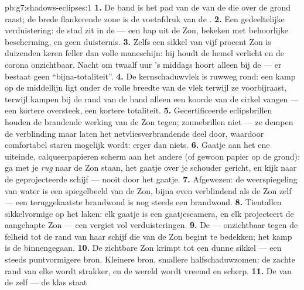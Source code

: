 \begin{solution}{pb:g7:shadows-eclipses:1}
\textbf{1.} De band is het pad van de  van de 
die over de grond raast; de brede flankerende zone is de voetafdruk
van de .
\textbf{2.} Een gedeeltelijke verduistering: de stad zit in de
 --- een hap uit de Zon, bekeken met behoorlijke
bescherming, en geen duisternis.
\textbf{3.} Zelfs een sikkel van vijf procent Zon is duizenden keren
feller dan volle maneschijn: hij houdt de hemel verlicht en de corona
onzichtbaar. Nacht om twaalf uur 's middags hoort alleen bij de
 --- er bestaat geen ``bijna-totaliteit''.
\textbf{4.} De kernschaduwvlek is ruwweg rond: een kamp op de
middellijn ligt onder de volle breedte van de vlek terwijl ze
voorbijraast, terwijl kampen bij de rand van de band alleen een koorde
van de cirkel vangen --- een kortere oversteek, een kortere
totaliteit.
\textbf{5.} Gecertificeerde eclipsbrillen houden de brandende werking
van de Zon tegen; zonnebrillen niet --- ze dempen de verblinding maar
laten het netvliesverbrandende deel door, waardoor comfortabel staren
mogelijk wordt: erger dan niets.
\textbf{6.} Gaatje aan het ene uiteinde, calqueerpapieren scherm aan
het andere (of gewoon papier op de grond): ga met je \emph{rug} naar
de Zon staan, het gaatje over je schouder gericht, en kijk naar de
geprojecteerde schijf --- nooit door het gaatje.
\textbf{7.} Afgewezen: de weerspiegeling van water is een
spiegelbeeld van de Zon, bijna even verblindend als de Zon zelf ---
een teruggekaatste brandwond is nog steeds een brandwond.
\textbf{8.} Tientallen sikkelvormige  op het laken: elk
gaatje is een gaatjescamera, en elk projecteert de aangehapte Zon ---
een vergiet vol verduisteringen.
\textbf{9.} De  --- onzichtbaar tegen de felheid tot de rand van
haar schijf die van de Zon begint te bedekken; het kamp is de
 binnengegaan.
\textbf{10.} De zichtbare Zon krimpt tot een dunne sikkel --- een
steeds puntvormigere bron. Kleinere bron, smallere halfschaduwzomen:
de zachte rand van elke  wordt strakker, en de wereld wordt
vreemd en scherp.
\textbf{11.} De  van de  zelf --- de klas staat

\end{solution}
